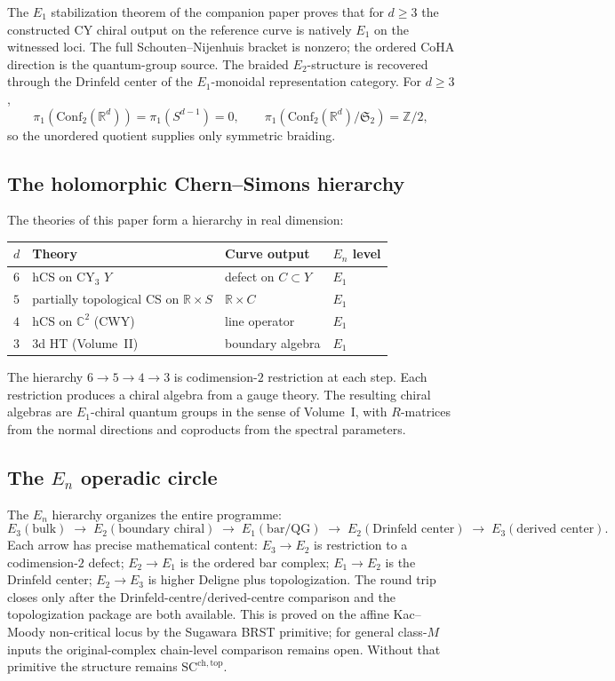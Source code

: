 \documentclass[11pt]{article}
\theoremstyle{plain}
\theoremstyle{definition}
\theoremstyle{remark}
\newcommand{\bC}{\mathbb{C}}
\newcommand{\bR}{\mathbb{R}}
\newcommand{\bZ}{\mathbb{Z}}
\newcommand{\Eone}{E_1}
\newcommand{\Etwo}{E_2}
\newcommand{\Ethree}{E_3}
\newcommand{\En}{E_n}
\newcommand{\Conf}{\mathrm{Conf}}
\newcommand{\SCchtop}{\mathrm{SC}^{\mathrm{ch},\mathrm{top}}}
\begin{document}
The $\Eone$ stabilization theorem of the companion paper
proves that for $d \geq 3$ the constructed CY chiral output on the
reference curve is natively $\Eone$ on the witnessed loci.  The full
Schouten--Nijenhuis bracket is nonzero; the ordered CoHA direction is
the quantum-group source.  The braided $\Etwo$-structure is recovered
through the Drinfeld center of the $\Eone$-monoidal representation
category. For $d\ge3$,
\[
\pi_1(\Conf_2(\bR^d))=\pi_1(S^{d-1})=0,
\qquad
\pi_1(\Conf_2(\bR^d)/\mathfrak S_2)=\bZ/2,
\]
so the unordered quotient supplies only symmetric braiding.

\subsection{The holomorphic Chern--Simons hierarchy}

The theories of this paper form a hierarchy in real dimension:
\begin{center}
\renewcommand{\arraystretch}{1.3}
\small
\begin{tabular}{llll}
 \toprule
 $d$ & Theory & Curve output & $\En$ level \\
 \midrule
 $6$ & hCS on CY$_3$ $Y$ & defect on $C \subset Y$ &
 $\Eone$ \\
 $5$ & partially topological CS on $\bR \times S$ &
 $\bR \times C$ & $\Eone$ \\
 $4$ & hCS on $\bC^2$ (CWY) & line operator & $\Eone$ \\
 $3$ & 3d HT (Volume~II) & boundary algebra & $\Eone$ \\
 \bottomrule
\end{tabular}
\end{center}
The hierarchy $6 \to 5 \to 4 \to 3$ is codimension-$2$ restriction
at each step.  Each restriction produces a chiral algebra from a
gauge theory.  The resulting chiral algebras are $\Eone$-chiral
quantum groups in the sense of Volume~I, with $R$-matrices from the
normal directions and coproducts from the spectral parameters.

\subsection{The $\En$ operadic circle}

The $\En$ hierarchy organizes the entire programme:
\[
 \Ethree(\text{bulk}) \;\to\;
 \Etwo(\text{boundary chiral}) \;\to\;
 \Eone(\text{bar/QG}) \;\to\;
 \Etwo(\text{Drinfeld center}) \;\to\;
 \Ethree(\text{derived center}).
\]
Each arrow has precise mathematical content:
$\Ethree \to \Etwo$ is restriction to a codimension-$2$ defect;
$\Etwo \to \Eone$ is the ordered bar complex;
$\Eone \to \Etwo$ is the Drinfeld center;
$\Etwo \to \Ethree$ is higher Deligne plus topologization.  The round
trip closes only after the Drinfeld-centre/derived-centre comparison
and the topologization package are both available.  This is proved on
the affine Kac--Moody non-critical locus by the Sugawara BRST
primitive; for general class-$M$ inputs the original-complex
chain-level comparison remains open.  Without that primitive the
structure remains $\SCchtop$.
\end{document}
